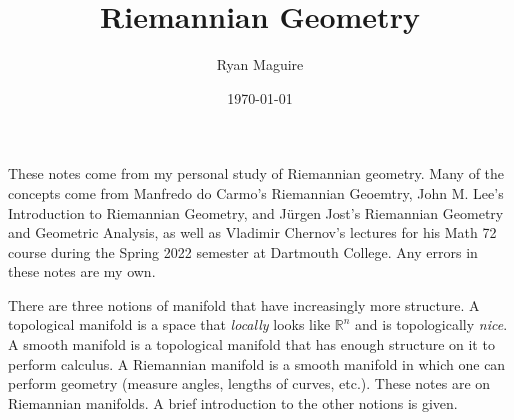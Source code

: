 \documentclass{article}
\title{Riemannian Geometry}
\author{Ryan Maguire}
\date{\today}
\theoremstyle{plain}
\theoremstyle{normal}
\begin{document}
    \maketitle
    These notes come from my personal study of Riemannian geometry. Many of
    the concepts come from Manfredo do Carmo's Riemannian Geoemtry, John
    M. Lee's Introduction to Riemannian Geometry, and J\"{u}rgen Jost's
    Riemannian Geometry and Geometric Analysis, as well as Vladimir Chernov's
    lectures for his Math 72 course during the Spring 2022 semester at
    Dartmouth College. Any errors in these notes are my own.
    \tableofcontents
    \listoffigures
    \newpage
    There are three notions of manifold that have increasingly more structure.
    A topological manifold is a space that \textit{locally} looks like
    $\mathbb{R}^{n}$ and is topologically \textit{nice}. A smooth manifold is
    a topological manifold that has enough structure on it to perform calculus.
    A Riemannian manifold is a smooth manifold in which one can perform
    geometry (measure angles, lengths of curves, etc.). These notes are on
    Riemannian manifolds. A brief introduction to the other notions is given.
\end{document}
